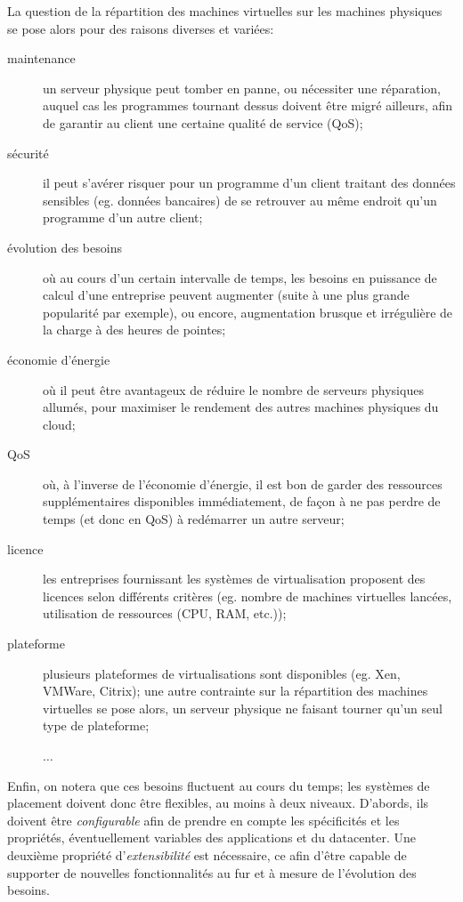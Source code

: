 \documentclass[a4paper]{article}
\begin{document}
La question de la répartition des machines virtuelles sur les machines
physiques se pose alors pour des raisons diverses et variées:
\begin{description}
	\item[maintenance] un serveur physique peut tomber en panne, ou
		nécessiter une réparation, auquel cas les programmes
		tournant dessus doivent être migré ailleurs, afin de
		garantir au client une certaine qualité de service (QoS);
	\item[sécurité] il peut s'avérer risquer pour un programme d'un
		client traitant des données sensibles (eg. données bancaires)
		de se retrouver au même endroit qu'un programme d'un
		autre client;
	\item[évolution des besoins] où au cours d'un certain intervalle de
		temps, les besoins en puissance de calcul d'une entreprise
		peuvent augmenter (suite à une plus grande popularité par
		exemple), ou encore, augmentation brusque et irrégulière
		de la charge à des heures de pointes;
	\item[économie d'énergie] où il peut être avantageux de réduire
		le nombre de serveurs physiques allumés, pour maximiser
		le rendement des autres machines physiques du cloud;
	\item[QoS] où, à l'inverse de l'économie d'énergie, il est bon
		de garder des ressources supplémentaires disponibles immédiatement,
		de façon à ne pas perdre de temps (et donc en QoS) à redémarrer
		un autre serveur;		
	\item[licence] les entreprises fournissant les systèmes de virtualisation
		proposent des licences selon différents critères (eg. nombre de
		machines virtuelles lancées, utilisation de ressources (CPU, RAM, etc.));
	\item[plateforme] plusieurs plateformes de virtualisations sont disponibles
		(eg. Xen, VMWare, Citrix); une autre contrainte sur la
		répartition des machines virtuelles se pose alors, un serveur
		physique ne faisant tourner qu'un seul type de plateforme;
	\item[] $\ldots$
\end{description}

Enfin, on notera que ces besoins fluctuent au cours du temps; les systèmes
de placement doivent donc être flexibles, au moins à deux niveaux.
D'abords, ils doivent être \textit{configurable} afin de prendre en compte
les spécificités et les propriétés, éventuellement variables des applications
et du datacenter. Une deuxième propriété d'\textit{extensibilité} est nécessaire,
ce afin d'être capable de supporter de nouvelles fonctionnalités au fur et à mesure
de l'évolution des besoins.
\end{document}
